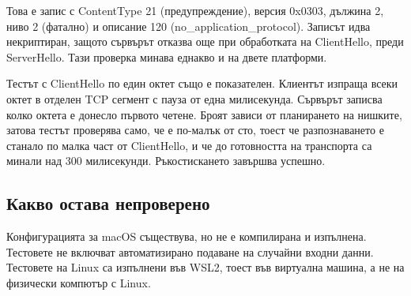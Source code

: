 Това е запис с ContentType 21 (предупреждение), версия 0x0303, дължина 2, ниво 2
(фатално) и описание 120 (no\_application\_protocol). Записът идва некриптиран, защото
сървърът отказва още при обработката на ClientHello, преди ServerHello. Тази проверка
минава еднакво и на двете платформи.

Тестът с ClientHello по един октет също е показателен. Клиентът изпраща всеки октет в
отделен TCP сегмент с пауза от една милисекунда. Сървърът записва колко октета е донесло
първото четене. Броят зависи от планирането на нишките, затова тестът проверява само, че
е по-малък от сто, тоест че разпознаването е станало по малка част от ClientHello, и че
до готовността на транспорта са минали над 300 милисекунди. Ръкостискането завършва
успешно.

\subsection{Какво остава непроверено}

Конфигурацията за macOS съществува, но не е компилирана и изпълнена. Тестовете не
включват автоматизирано подаване на случайни входни данни. Тестовете на Linux са
изпълнени във WSL2, тоест във виртуална машина, а не на физически компютър с Linux.
